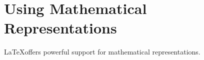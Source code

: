 \chapter{Using Mathematical Representations}

\LaTeX offers powerful support for mathematical representations.
